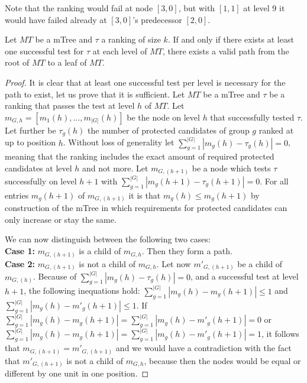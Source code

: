 %
Note that the ranking would fail at node $[3,0]$, but with $[1,1]$ at level 9 it would have failed already at $[3,0]$'s predecessor $[2,0]$.
%
\begin{theorem}
\label{theorem:lazy-mTree-test}
Let $MT$ be a mTree and $\tau$ a ranking of size $k$. If and only if there exists at least one successful test for $\tau$ at each level of $MT$, there exists a valid path from the root of $MT$ to a leaf of $MT$.
\end{theorem}
%
\begin{proof}
	\label{proof:lazy-mTree-test}
	It is clear that at least one successful test per level is necessary for the path to exist, let us prove that it is sufficient.
	Let $MT$ be a mTree and $\tau$ be a ranking that passes the test at level $h$ of $MT$.
	Let $m_{G,h}=[m_{1}(h), \ldots, m_{|G|}(h)]$ be the node on level $h$ that successfully tested $\tau$.
	Let further be $\tau_g(h)$ the number of protected candidates of group $g$ ranked at up to position $h$.
	Without loss of generality let $\sum_{g=1}^{|G|} |m_{g}(h) - \tau_{g}(h)| = 0$, meaning that the ranking includes the exact amount of required protected candidates at level $h$ and not more.
	Let $m_{G,(h+1)}$ be a node which tests $\tau$ successfully on level $h+1$ with $\sum_{g=1}^{|G|} |m_{g}(h+1) - \tau_{g}(h+1)| = 0$.
	For all entries $m_{g}(h+1)$ of $m_{G,(h+1)}$ it is that $m_{g}(h) \leq m_{g}(h+1)$ by construction of the mTree in which requirements for protected candidates can only increase or stay the same.

	\noindent We can now distinguish between the following two cases:
	\\
	\textbf{Case 1:} $m_{G,(h+1)}$ is a child of $m_{G,h}$.
	Then they form a path. %
	\\
	\textbf{Case 2:} $m_{G,(h+1)}$ is not a child of $m_{G,h}$.
	Let now ${m'}_{G,(h+1)}$ be a child of $m_{G,(h)}$.
	Because of $\sum_{g=1}^{|G|} |m_{g}(h) - \tau_{g}(h)| = 0$, and a successful test at level $h+1$, the following inequations hold: $\sum_{g=1}^{|G|} |m_{g}(h) - m_g(h+1)| \leq 1$ and $\sum_{g=1}^{|G|} |m_{g}(h) - m'_g(h+1)| \leq 1$.
	If $\sum_{g=1}^{|G|} |m_{g}(h) - m_g(h+1)| = \sum_{g=1}^{|G|} |m_{g}(h) - m'_g(h+1)| = 0$ or $\sum_{g=1}^{|G|} |m_{g}(h) - m_g(h+1)| = \sum_{g=1}^{|G|} |m_{g}(h) - m'_g(h+1)| = 1$, it follows that $m_{G,(h+1)} = {m'}_{G,(h+1)}$ and we would have a contradiction with the fact that ${m'}_{G,(h+1)}$ is not a child of $m_{G,h}$, because then the nodes would be equal or different by one unit in one position.


\end{proof}
